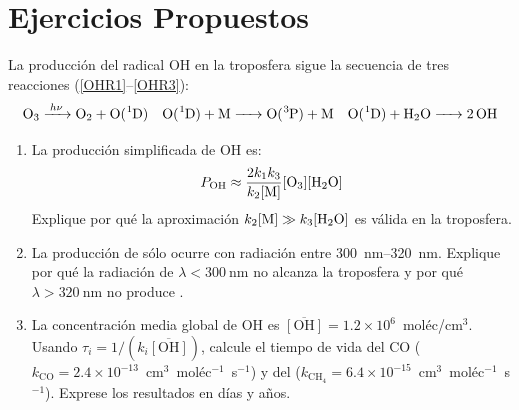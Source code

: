 \newpage
\section*{Ejercicios Propuestos}
\label{sec:ejercicios_cap10}

\begin{bloque_ejercicios}

\begin{ejercicios}

\item La producci\'on del radical OH en la troposfera sigue la
secuencia de tres reacciones (\ref{OHR1}--\ref{OHR3}):
\[
    \ce{O3 ->[$h\nu$] O2 + O(^1D)} \quad
    \ce{O(^1D) + M -> O(^3P) + M} \quad
    \ce{O(^1D) + H2O -> 2OH}
\]

\begin{enumerate}[label=\alph*)]
    \item La producci\'on simplificada de OH es:
          \[
              P_{\mathrm{OH}} \approx
              \frac{2k_1 k_3}{k_2[\mathrm{M}]}[\ce{O3}][\ce{H2O}]
          \]
          Explique por qu\'e la aproximaci\'on $k_2[\mathrm{M}] \gg
          k_3[\ce{H2O}]$ es v\'alida en la troposfera.

    \item La producci\'on de  s\'olo ocurre con radiaci\'on
          entre \SIrange{300}{320}{\nano\metre}. Explique por qu\'e
          la radiaci\'on de $\lambda < \SI{300}{\nano\metre}$ no
          alcanza la troposfera y por qu\'e $\lambda > \SI{320}{\nano\metre}$
          no produce .

    \item La concentraci\'on media global de OH es
          $\overline{[\mathrm{OH}]} = 1.2\times10^6$~mol\'ec/cm$^3$.
          Usando $\tau_i = 1/(k_i\overline{[\mathrm{OH}]})$,
          calcule el tiempo de vida del CO
          ($k_{\mathrm{CO}} = 2.4\times10^{-13}$~cm$^3$~mol\'ec$^{-1}$~s$^{-1}$)
          y del 
          ($k_{\mathrm{CH_4}} = 6.4\times10^{-15}$~cm$^3$~mol\'ec$^{-1}$~s$^{-1}$).
          Exprese los resultados en d\'ias y a\~nos.


\end{enumerate}
\end{ejercicios}
\end{bloque_ejercicios}

